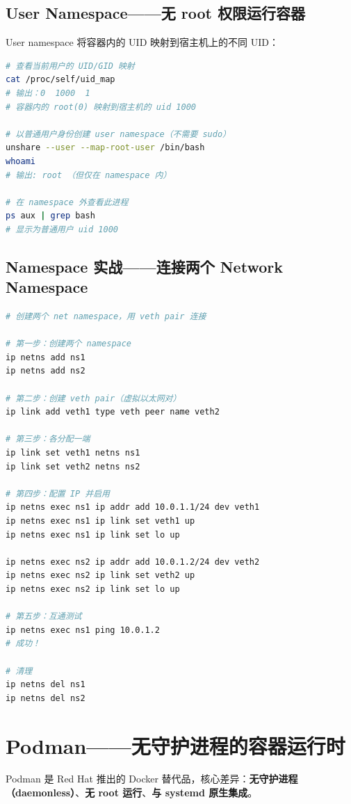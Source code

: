 \documentclass[12pt,UTF8]{ctexbook}
\begin{document}
\subsection{User Namespace——无 root 权限运行容器}

User namespace 将容器内的 UID 映射到宿主机上的不同 UID：

\begin{lstlisting}[language=bash]
# 查看当前用户的 UID/GID 映射
cat /proc/self/uid_map
# 输出：0  1000  1
# 容器内的 root(0) 映射到宿主机的 uid 1000

# 以普通用户身份创建 user namespace（不需要 sudo）
unshare --user --map-root-user /bin/bash
whoami
# 输出: root （但仅在 namespace 内）

# 在 namespace 外查看此进程
ps aux | grep bash
# 显示为普通用户 uid 1000
\end{lstlisting}

\subsection{Namespace 实战——连接两个 Network Namespace}

\begin{lstlisting}[language=bash]
# 创建两个 net namespace，用 veth pair 连接

# 第一步：创建两个 namespace
ip netns add ns1
ip netns add ns2

# 第二步：创建 veth pair（虚拟以太网对）
ip link add veth1 type veth peer name veth2

# 第三步：各分配一端
ip link set veth1 netns ns1
ip link set veth2 netns ns2

# 第四步：配置 IP 并启用
ip netns exec ns1 ip addr add 10.0.1.1/24 dev veth1
ip netns exec ns1 ip link set veth1 up
ip netns exec ns1 ip link set lo up

ip netns exec ns2 ip addr add 10.0.1.2/24 dev veth2
ip netns exec ns2 ip link set veth2 up
ip netns exec ns2 ip link set lo up

# 第五步：互通测试
ip netns exec ns1 ping 10.0.1.2
# 成功！

# 清理
ip netns del ns1
ip netns del ns2
\end{lstlisting}

\section{Podman——无守护进程的容器运行时}
\label{sec:podman}

Podman 是 Red Hat 推出的 Docker 替代品，核心差异：\textbf{无守护进程（daemonless）}、\textbf{无 root 运行}、\textbf{与 systemd 原生集成}。
\end{document}
